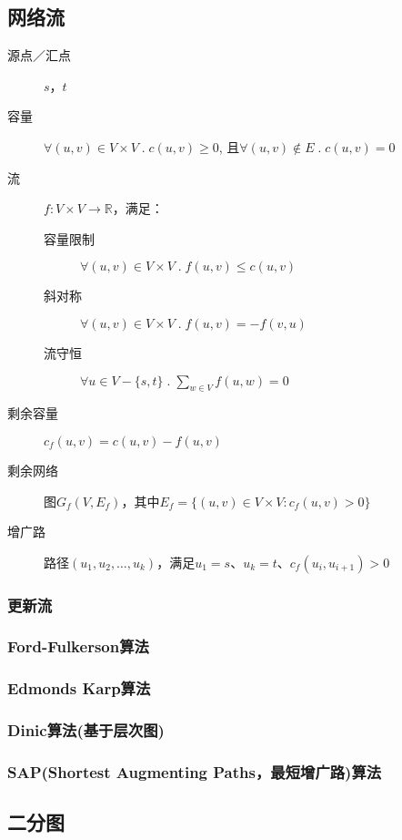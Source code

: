 \subsection{网络流}
\begin{description}
\item[源点／汇点] $s$，$t$
\item[容量] $\forall (u, v)  \in V \times V \;.\; c(u, v) \geqslant 0$, 且$\forall (u, v) \not\in E\;.\; c(u,v) = 0$
\item[流] $f:V \times V \rightarrow \mathbb{R} $，满足：
\begin{description}
\item[容量限制] $\forall (u, v) \in V \times V \;.\; f(u, v) \leqslant c(u, v) $
\item[斜对称] $\forall (u, v) \in V \times V \;.\; f(u, v) = -f(v, u)$
\item[流守恒] $\forall u \in V-\{s, t\} \;.\;\sum_{w \in V} f(u, w) = 0$
\end{description}
\item[剩余容量] $c_f(u,v) = c(u,v) - f(u,v)$
\item[剩余网络] 图$G_f(V, E_f)$，其中$E_f = \{(u,v) \in V \times V : c_f(u, v) > 0\}$
\item[增广路] 路径$(u_1, u_2, \dots, u_k)$，满足$u_1 = s$、$u_k = t$、$c_f(u_i, u_{i+1}) > 0$
\end{description}
\subsubsection{更新流}
\subsubsection{Ford-Fulkerson算法}
\subsubsection{Edmonds Karp算法}
\subsubsection{Dinic算法(基于层次图)}
\subsubsection{SAP(Shortest Augmenting Paths，最短增广路)算法}

\subsection{二分图}
